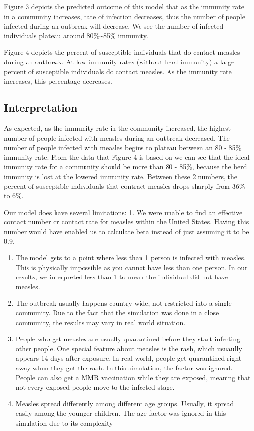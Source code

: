 \documentclass[11pt]{article}
\begin{document}
Figure 3 depicts the predicted outcome of this model that as the
immunity rate in a community increases, rate of infection decreases,
thus the number of people infected during an outbreak will decrease. We
see the number of infected individuals plateau around
80\%\textasciitilde{}85\% immunity.

Figure 4 depicts the percent of susceptible individuals that do contact
measles during an outbreak. At low immunity rates (without herd
immunity) a large percent of susceptible individuals do contact measles.
As the immunity rate increases, this percentage decreases.

    \hypertarget{interpretation}{%
\subsection{Interpretation}\label{interpretation}}

As expected, as the immunity rate in the community increased, the
highest number of people infected with measles during an outbreak
decreased. The number of people infected with measles begins to plateau
between an 80 - 85\% immunity rate. From the data that Figure 4 is based
on we can see that the ideal immunity rate for a community should be
more than 80 - 85\%, because the herd immunity is lost at the lowered
immunity rate. Between these 2 numbers, the percent of susceptible
individuals that contract measles drops sharply from 36\% to 6\%.

Our model does have several limitations: 1. We were unable to find an
effective contact number or contact rate for measles within the United
States. Having this number would have enabled us to calculate beta
instead of just assuming it to be 0.9.

\begin{enumerate}
\def\labelenumi{\arabic{enumi}.}
\setcounter{enumi}{1}
\item
  The model gets to a point where less than 1 person is infected with
  measles. This is physically impossible as you cannot have less than
  one person. In our results, we interpreted less than 1 to mean the
  individual did not have measles.
\item
  The outbreak usually happens country wide, not restricted into a
  single community. Due to the fact that the simulation was done in a
  close community, the results may vary in real world situation.
\item
  People who get measles are usually quarantined before they start
  infecting other people. One special feature about measles is the rash,
  which usuaully appears 14 days after exposure. In real world, people
  get quarantined right away when they get the rash. In this simulation,
  the factor was ignored. People can also get a MMR vaccination while
  they are exposed, meaning that not every exposed people move to the
  infected stage.
\item
  Measles spread differently among different age groups. Usually, it
  spread easily among the younger children. The age factor was ignored
  in this simulation due to its complexity.
\end{enumerate}
\end{document}
